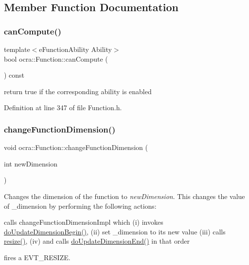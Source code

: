 \subsection{Member Function Documentation}
\hypertarget{classocra_1_1Function_a9483d0d23002c7e1a20033e6ea224e2d}{}\label{classocra_1_1Function_a9483d0d23002c7e1a20033e6ea224e2d} 
\subsubsection{\texorpdfstring{can\+Compute()}{canCompute()}}
{\footnotesize\ttfamily template$<$e\+Function\+Ability Ability$>$ \\
bool ocra\+::\+Function\+::can\+Compute (\begin{DoxyParamCaption}{ }\end{DoxyParamCaption}) const\hspace{0.3cm}{\ttfamily [inline]}}

return true if the corresponding ability is enabled 

Definition at line 347 of file Function.\+h.

\hypertarget{classocra_1_1Function_ad9800654d8a33fd91d7ea52038c2fb94}{}\label{classocra_1_1Function_ad9800654d8a33fd91d7ea52038c2fb94} 
\subsubsection{\texorpdfstring{change\+Function\+Dimension()}{changeFunctionDimension()}}
{\footnotesize\ttfamily void ocra\+::\+Function\+::change\+Function\+Dimension (\begin{DoxyParamCaption}\item[{int}]{new\+Dimension }\end{DoxyParamCaption})\hspace{0.3cm}{\ttfamily [protected]}}

Changes the dimension of the function to {\itshape new\+Dimension}. This changes the value of \+\_\+dimension by performing the following actions\+:
\begin{DoxyItemize}
\item calls change\+Function\+Dimension\+Impl which (i) invokes \hyperlink{classocra_1_1Function_afdf98e9f43fde97a5256af88a50cbb39}{do\+Update\+Dimension\+Begin()}, (ii) set \+\_\+dimension to its new value (iii) calls \hyperlink{classocra_1_1Function_aa59cd6d7965f6b2222261ef460d4899c}{resize()}, (iv) and calls \hyperlink{classocra_1_1Function_a17aa280f0e6eff4a7569edc373a5147d}{do\+Update\+Dimension\+End()} in that order
\item fires a E\+V\+T\+\_\+\+R\+E\+S\+I\+ZE.
\end{DoxyItemize}

